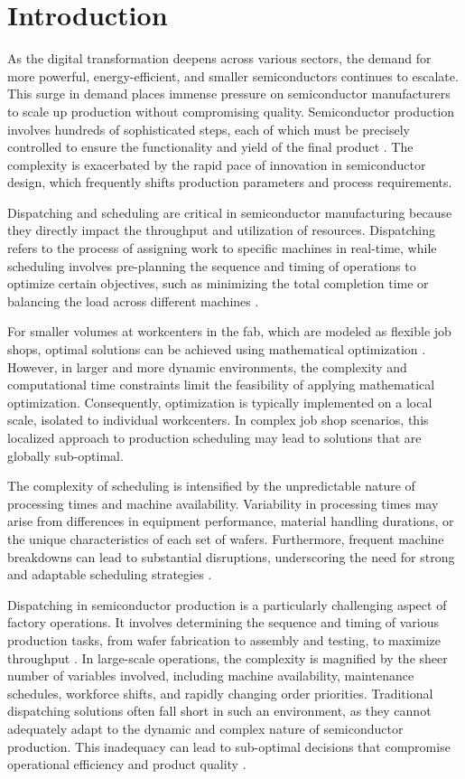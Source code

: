 \documentclass[runningheads]{llncs}
\begin{document}
\section{Introduction}
\label{sec:introduction}
As the digital transformation deepens across various sectors, the demand for more powerful, energy-efficient, and smaller semiconductors continues to escalate. This surge in demand places immense pressure on semiconductor manufacturers to scale up production without compromising quality. Semiconductor production involves hundreds of sophisticated steps, each of which must be precisely controlled to ensure the functionality and yield of the final product \cite{kopp2020smt2020}. The complexity is exacerbated by the rapid pace of innovation in semiconductor design, which frequently shifts production parameters and process requirements.

Dispatching and scheduling are critical in semiconductor manufacturing because they directly impact the throughput and utilization of resources. Dispatching refers to the process of assigning work to specific machines in real-time, while scheduling involves pre-planning the sequence and timing of operations to optimize certain objectives, such as minimizing the total completion time or balancing the load across different machines \cite{schumann2022scheduling}.

For smaller volumes at workcenters in the fab, which are modeled as flexible job shops, optimal solutions can be achieved using mathematical optimization \cite{waschneck2018deep}. However, in larger and more dynamic environments, the complexity and computational time constraints limit the feasibility of applying mathematical optimization. Consequently, optimization is typically implemented on a local scale, isolated to individual workcenters. In complex job shop scenarios, this localized approach to production scheduling may lead to solutions that are globally sub-optimal.

The complexity of scheduling is intensified by the unpredictable nature of processing times and machine availability. Variability in processing times may arise from differences in equipment performance, material handling durations, or the unique characteristics of each set of wafers. Furthermore, frequent machine breakdowns can lead to substantial disruptions, underscoring the need for strong and adaptable scheduling strategies \cite{leachman1996benchmarking}.

Dispatching in semiconductor production is a particularly challenging aspect of factory operations. It involves determining the sequence and timing of various production tasks, from wafer fabrication to assembly and testing, to maximize throughput \cite{Hopp2011}. In large-scale operations, the complexity is magnified by the sheer number of variables involved, including machine availability, maintenance schedules, workforce shifts, and rapidly changing order priorities. Traditional dispatching solutions often fall short in such an environment, as they cannot adequately adapt to the dynamic and complex nature of semiconductor production. This inadequacy can lead to sub-optimal decisions that compromise operational efficiency and product quality \cite{Uzsoy1992}.
\end{document}
